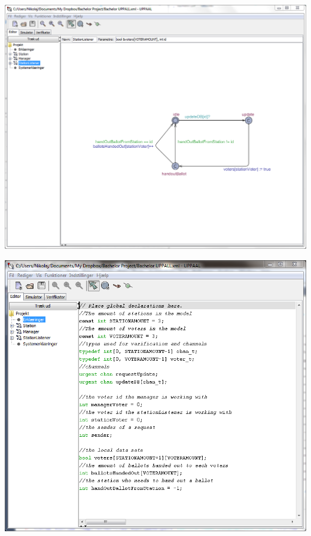\documentclass[a4paper]{report}
\begin{document}
\begin{center}
\includegraphics[width=\textwidth]{UPPAAL5.png}
\end{center}
\begin{center}
\includegraphics[width=\textwidth]{UPPAAL6.png}
\end{center}
\end{document}
